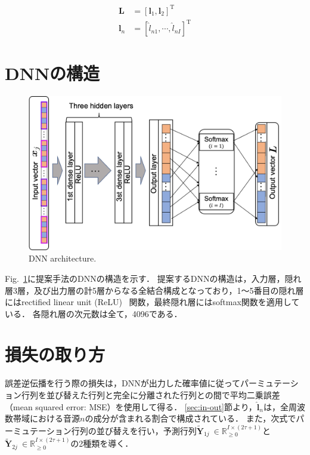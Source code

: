 \begin{align}
    \bm{L} &= [\bm{l}_{1} , \bm{l}_{2}]^\mathrm{T}\\
    \bm{l}_n &= [\widehat{l}_{n 1}, \cdots, \widehat{l}_{n I}]^\mathrm{T}
\end{align}


\clearpage
\section{DNNの構造}
\label{sec:model}
\begin{figure}[t]
    \begin{center}
        \includegraphics[width=0.8\columnwidth]{figures/overview_DNN.pdf}
    \end{center}
    \vspace{-8pt}
	\caption{DNN architecture.}
	\label{fig:Dnnmodel}
\end{figure}

Fig.~\ref{fig:Dnnmodel}に提案手法のDNNの構造を示す．
提案するDNNの構造は，入力層，隠れ層3層，及び出力層の計5層からなる全結合構成となっており，1～5番目の隠れ層にはrectified linear unit (ReLU)~\cite{relu} 関数，最終隠れ層にはsoftmax関数を適用している．
各隠れ層の次元数は全て，4096である．

\section{損失の取り方}
\label{sec:loss}
誤差逆伝播を行う際の損失は，DNNが出力した確率値に従ってパーミュテーション行列を並び替えた行列と完全に分離された行列との間で平均二乗誤差（mean squared error: MSE）を使用して得る．
\ref{sec:in-out}節より，$\widehat{\bm{l}}_{n}$は，全周波数帯域における音源$n$の成分が含まれる割合で構成されている．
また，次式でパーミュテーション行列の並び替えを行い，予測行列$\widetilde{\bm{Y}}_{1 j} ~\in \mathbb{R}_{\geq 0}^{I \times (2\tau+1)}$と$\widetilde{\bm{Y}}_{2 j} ~\in \mathbb{R}_{\geq 0}^{I \times (2\tau+1)}$の2種類を導く．

